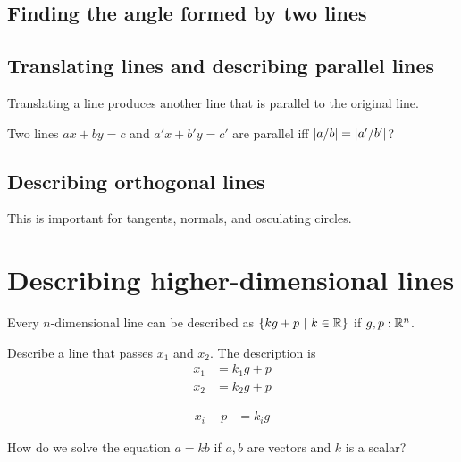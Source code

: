 \subsection{Finding the angle formed by two lines}

\subsection{Translating lines and describing parallel lines}

Translating a line produces another line that is parallel to the original line.

Two lines \(ax+by=c\) and \(a'x+b'y=c'\) are parallel iff \(\abs{a/b} = \abs{a'/b'}\)?

\subsection{Describing orthogonal lines}

This is important for tangents, normals, and osculating circles.

\section{Describing higher-dimensional lines}

Every \(n\)-dimensional line can be described as
\( \{ k g + p ~|~ k \in \mathbb{R} \} \)
if \(g, p : \mathbb{R}^n\).

Describe a line that passes \(x_1\) and \(x_2\).
The description is
\begin{align*}
    x_1 &= k_1 g + p
    \\
    x_2 &= k_2 g + p
\end{align*}

\begin{align*}
    x_i - p &= k_i g
\end{align*}

How do we solve the equation \(a = kb\) if \(a,b\) are vectors and \(k\) is a scalar?
